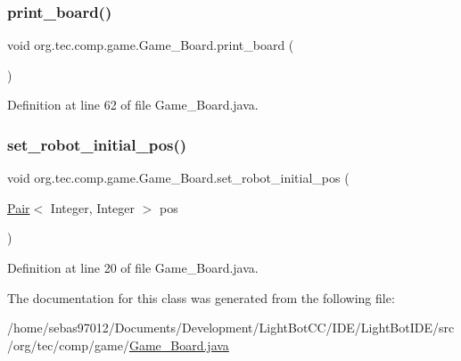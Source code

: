 \mbox{\label{classorg_1_1tec_1_1comp_1_1game_1_1_game___board_a175457969c10e2d378dac5593094167a}} 
\subsubsection{\texorpdfstring{print\+\_\+board()}{print\_board()}}
{\footnotesize\ttfamily void org.\+tec.\+comp.\+game.\+Game\+\_\+\+Board.\+print\+\_\+board (\begin{DoxyParamCaption}{ }\end{DoxyParamCaption})\hspace{0.3cm}{\ttfamily [inline]}}



Definition at line 62 of file Game\+\_\+\+Board.\+java.

\mbox{\label{classorg_1_1tec_1_1comp_1_1game_1_1_game___board_af7dadc1a7038ba5d162594d72493be73}} 
\subsubsection{\texorpdfstring{set\+\_\+robot\+\_\+initial\+\_\+pos()}{set\_robot\_initial\_pos()}}
{\footnotesize\ttfamily void org.\+tec.\+comp.\+game.\+Game\+\_\+\+Board.\+set\+\_\+robot\+\_\+initial\+\_\+pos (\begin{DoxyParamCaption}\item[{\mbox{\hyperlink{classorg_1_1tec_1_1comp_1_1interpreter_1_1_pair}{Pair}}$<$ Integer, Integer $>$}]{pos }\end{DoxyParamCaption})\hspace{0.3cm}{\ttfamily [inline]}}



Definition at line 20 of file Game\+\_\+\+Board.\+java.



The documentation for this class was generated from the following file\+:\begin{DoxyCompactItemize}
\item 
/home/sebas97012/\+Documents/\+Development/\+Light\+Bot\+C\+C/\+I\+D\+E/\+Light\+Bot\+I\+D\+E/src/org/tec/comp/game/\mbox{\hyperlink{_game___board_8java}{Game\+\_\+\+Board.\+java}}\end{DoxyCompactItemize}
